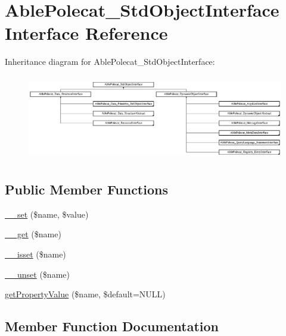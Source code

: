 \hypertarget{interface_able_polecat___std_object_interface}{}\section{Able\+Polecat\+\_\+\+Std\+Object\+Interface Interface Reference}
\label{interface_able_polecat___std_object_interface}
Inheritance diagram for Able\+Polecat\+\_\+\+Std\+Object\+Interface\+:\begin{figure}[H]
\begin{center}
\leavevmode
\includegraphics[height=3.758389cm]{interface_able_polecat___std_object_interface}
\end{center}
\end{figure}
\subsection*{Public Member Functions}
\begin{DoxyCompactItemize}
\item 
\hyperlink{interface_able_polecat___std_object_interface_a83c2703c91959192f759992ad5640b67}{\+\_\+\+\_\+set} (\$name, \$value)
\item 
\hyperlink{interface_able_polecat___std_object_interface_abc8e9e31bb15c8a44c3210ec551407c8}{\+\_\+\+\_\+get} (\$name)
\item 
\hyperlink{interface_able_polecat___std_object_interface_a8f132f051b7cd7d570ccb9f6e2bb4201}{\+\_\+\+\_\+isset} (\$name)
\item 
\hyperlink{interface_able_polecat___std_object_interface_a8a93654c7bfe3f0a9bb7af531e513d44}{\+\_\+\+\_\+unset} (\$name)
\item 
\hyperlink{interface_able_polecat___std_object_interface_ae19bae5fa6db97601313c55ad17508e9}{get\+Property\+Value} (\$name, \$default=N\+U\+L\+L)
\end{DoxyCompactItemize}


\subsection{Member Function Documentation}
\hypertarget{interface_able_polecat___std_object_interface_abc8e9e31bb15c8a44c3210ec551407c8}{}
